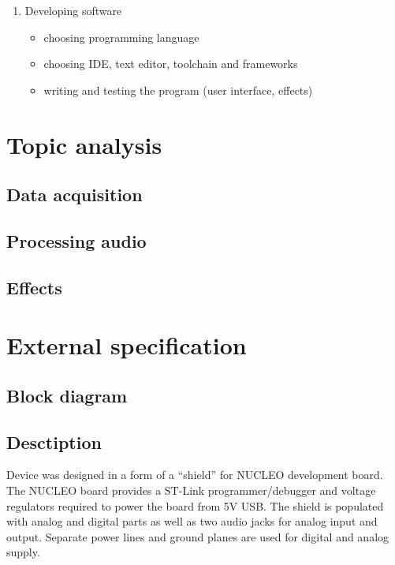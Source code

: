 \documentclass{article}
\begin{document}
\begin{enumerate}
    \item Developing software
    \begin{itemize}
        \item choosing programming language
        \item choosing IDE, text editor, toolchain and frameworks
        \item writing and testing the program (user interface, effects)
    \end{itemize}
\end{enumerate}



\newpage



\section{Topic analysis}

\subsection{Data acquisition}

\subsection{Processing audio}

\subsection{Effects}

\newpage



\section{External specification}

\subsection{Block diagram}

\subsection{Desctiption}
Device was designed in a form of a “shield” for NUCLEO development board.
The NUCLEO board provides a ST-Link programmer/debugger and voltage regulators required to power the board from 5V USB.
The shield is populated with analog and digital parts as well as two audio jacks for analog input and output.
Separate power lines and ground planes are used for digital and analog supply.
\end{document}
